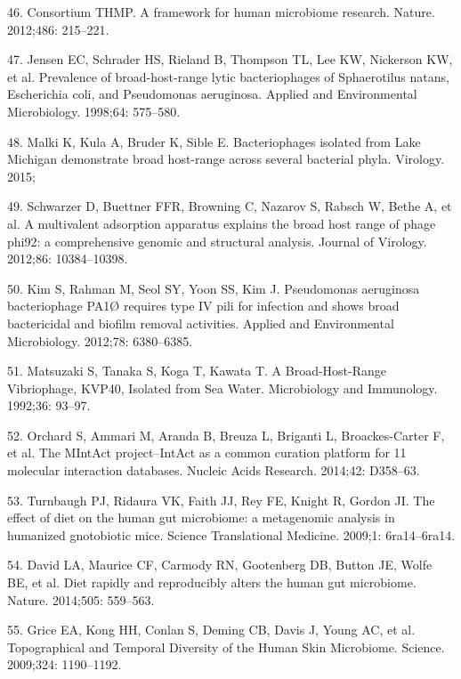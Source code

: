 \documentclass[12pt,]{article}
\begin{document}
\hypertarget{ref-Consortium:2012iz}{}
46. Consortium THMP. A framework for human microbiome research. Nature.
2012;486: 215--221.

\hypertarget{ref-Jensen:1998vh}{}
47. Jensen EC, Schrader HS, Rieland B, Thompson TL, Lee KW, Nickerson
KW, et al. Prevalence of broad-host-range lytic bacteriophages of
Sphaerotilus natans, Escherichia coli, and Pseudomonas aeruginosa.
Applied and Environmental Microbiology. 1998;64: 575--580.

\hypertarget{ref-Malki:2015tm}{}
48. Malki K, Kula A, Bruder K, Sible E. Bacteriophages isolated from
Lake Michigan demonstrate broad host-range across several bacterial
phyla. Virology. 2015;

\hypertarget{ref-Schwarzer:2012ez}{}
49. Schwarzer D, Buettner FFR, Browning C, Nazarov S, Rabsch W, Bethe A,
et al. A multivalent adsorption apparatus explains the broad host range
of phage phi92: a comprehensive genomic and structural analysis. Journal
of Virology. 2012;86: 10384--10398.

\hypertarget{ref-Kim:2012dh}{}
50. Kim S, Rahman M, Seol SY, Yoon SS, Kim J. Pseudomonas aeruginosa
bacteriophage PA1Ø requires type IV pili for infection and shows broad
bactericidal and biofilm removal activities. Applied and Environmental
Microbiology. 2012;78: 6380--6385.

\hypertarget{ref-Matsuzaki:1992gw}{}
51. Matsuzaki S, Tanaka S, Koga T, Kawata T. A Broad-Host-Range
Vibriophage, KVP40, Isolated from Sea Water. Microbiology and
Immunology. 1992;36: 93--97.

\hypertarget{ref-Orchard:2014hq}{}
52. Orchard S, Ammari M, Aranda B, Breuza L, Briganti L, Broackes-Carter
F, et al. The MIntAct project--IntAct as a common curation platform for
11 molecular interaction databases. Nucleic Acids Research. 2014;42:
D358--63.

\hypertarget{ref-Turnbaugh:2009hf}{}
53. Turnbaugh PJ, Ridaura VK, Faith JJ, Rey FE, Knight R, Gordon JI. The
effect of diet on the human gut microbiome: a metagenomic analysis in
humanized gnotobiotic mice. Science Translational Medicine. 2009;1:
6ra14--6ra14.

\hypertarget{ref-David:2014cl}{}
54. David LA, Maurice CF, Carmody RN, Gootenberg DB, Button JE, Wolfe
BE, et al. Diet rapidly and reproducibly alters the human gut
microbiome. Nature. 2014;505: 559--563.

\hypertarget{ref-Grice:2009ee}{}
55. Grice EA, Kong HH, Conlan S, Deming CB, Davis J, Young AC, et al.
Topographical and Temporal Diversity of the Human Skin Microbiome.
Science. 2009;324: 1190--1192.
\end{document}
